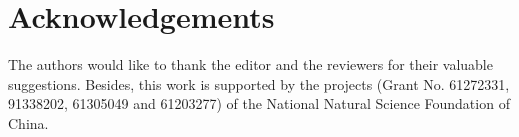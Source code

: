 \documentclass[a4paper]{article}
\begin{document}
\section*{Acknowledgements}

The authors would like to thank the editor and the reviewers for their
valuable suggestions. Besides, this work is supported by the projects
(Grant No. 61272331, 91338202, 61305049 and 61203277) of the National
Natural Science Foundation of China.


\end{document}
